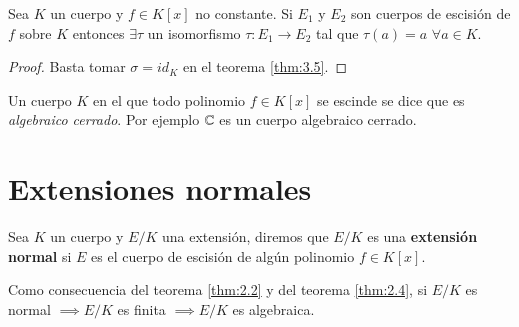 \begin{cor}
    Sea $K$ un cuerpo y $f \in K[x]$ no constante. Si $E_1$ y $E_2$ son cuerpos de escisión de $f$ sobre $K$ entonces $\exists \tau$ un isomorfismo $\tau: E_1 \to E_2$ tal que $\tau(a) = a$ $\forall a \in K$.
\end{cor}
\begin{proof}
    Basta tomar $\sigma = id_K$ en el teorema \ref{thm:3.5}.
\end{proof}

\begin{obs}
    Un cuerpo $K$ en el que todo polinomio $f \in K[x]$ se escinde se dice que es \textit{algebraico cerrado}. Por ejemplo $\mathbb{C}$ es un cuerpo algebraico cerrado.
\end{obs}

\section{Extensiones normales}

\begin{dfn}
    Sea $K$ un cuerpo y $E/K$ una extensión, diremos que $E/K$ es una \textbf{extensión normal} si $E$ es el cuerpo de escisión de algún polinomio $f \in K[x]$.
\end{dfn}

\begin{obs}
    Como consecuencia del teorema \ref{thm:2.2} y del teorema \ref{thm:2.4}, si $E/K$ es normal $\implies E/K$ es finita $\implies E/K$ es algebraica.
\end{obs}


